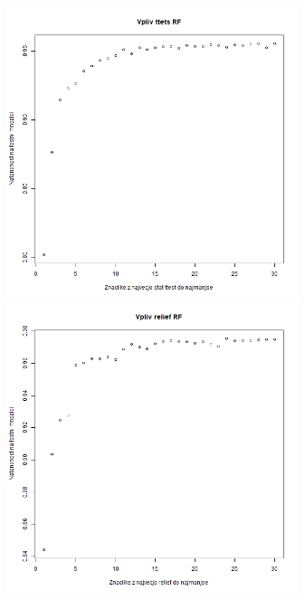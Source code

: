 \documentclass[12pt]{article}
\begin{document}
\begin{center}    
    \includegraphics[width=8.5cm, height=8.5cm]{ttestRF.jpg}
    \includegraphics[width=8.5cm, height=8.5cm]{relRF.jpg}
\end{center}
\end{document}
